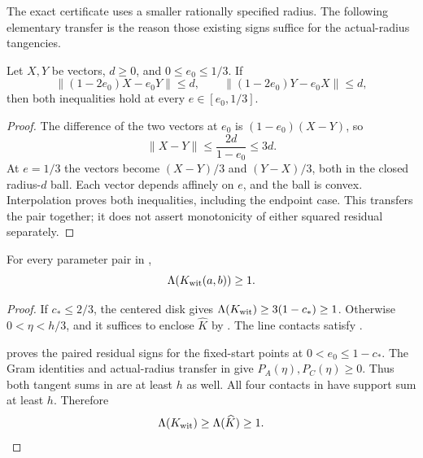 The exact certificate uses a smaller rationally specified radius. The
following elementary transfer is the reason those existing signs suffice
for the actual-radius tangencies.

\begin{lemma}
\label{lem:paired-radius-transfer}
Let $X,Y$ be vectors, $d\ge0$, and $0\le e_0\le1/3$. If
\[
 \|(1-2e_0)X-e_0Y\|\le d,\qquad
 \|(1-2e_0)Y-e_0X\|\le d,
\]
then both inequalities hold at every $e\in[e_0,1/3]$.
\end{lemma}

\begin{proof}
The difference of the two vectors at $e_0$ is $(1-e_0)(X-Y)$, so
\[
 \|X-Y\|\le\frac{2d}{1-e_0}\le3d.
\]
At $e=1/3$ the vectors become $(X-Y)/3$ and $(Y-X)/3$, both in the
closed radius-$d$ ball. Each vector depends affinely on $e$, and the ball
is convex. Interpolation proves both inequalities, including the endpoint
case. This transfers the pair together; it does not assert monotonicity of
either squared residual separately.
\end{proof}

\begin{lemma}
\label{lem:appendix-witness-enclosure-calculation}
For every parameter pair in ,
\[
 \Lambda(K_{\rm wit}(a,b))\ge1.
\]
\end{lemma}

\begin{proof}
If $c_*\le2/3$, the centered disk gives
$\Lambda(K_{\rm wit})\ge3(1-c_*)\ge1$. Otherwise
$0<\eta<h/3$, and it suffices to enclose $\widehat K$ by
. The line contacts satisfy
.

 proves the paired residual
signs for the fixed-start points at $0<e_0\le1-c_*$.  The Gram identities
and actual-radius transfer in 
give $P_A(\eta),P_C(\eta)\ge0$. Thus both tangent sums in
 are at least $h$ as well.
All four contacts in  have support sum at
least $h$. Therefore
\[
 \Lambda(K_{\rm wit})\ge\Lambda(\widehat K)\ge1.
\]
\end{proof}
